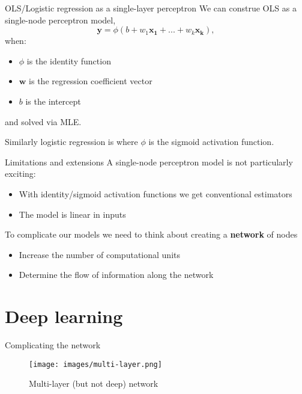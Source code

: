 \documentclass[
  ignorenonframetext,
]{beamer}
\providecommand{\tightlist}{%
  \setlength{\itemsep}{0pt}\setlength{\parskip}{0pt}}
\begin{document}
\begin{frame}{OLS/Logistic regression as a single-layer perceptron}
\protect\hypertarget{olslogistic-regression-as-a-single-layer-perceptron}{}
We can construe OLS as a single-node perceptron model, \[
\bm{y} = \phi(b + w_1\bm{x_1} + ... + w_k\bm{x_k}),
\] when:

\begin{itemize}
\tightlist
\item
  \(\phi\) is the identity function
\item
  \(\bm{w}\) is the regression coefficient vector
\item
  \(b\) is the intercept
\end{itemize}

and solved via MLE.

Similarly logistic regression is where \(\phi\) is the sigmoid
activation function.
\end{frame}

\begin{frame}{Limitations and extensions}
\protect\hypertarget{limitations-and-extensions}{}
A single-node perceptron model is not particularly exciting:

\begin{itemize}
\tightlist
\item
  With identity/sigmoid activation functions we get conventional
  estimators
\item
  The model is linear in inputs
\end{itemize}

To complicate our models we need to think about creating a
\textbf{network} of nodes

\begin{itemize}
\tightlist
\item
  Increase the number of computational units
\item
  Determine the flow of information along the network
\end{itemize}
\end{frame}

\hypertarget{deep-learning}{%
\section{Deep learning}\label{deep-learning}}

\begin{frame}{Complicating the network}
\protect\hypertarget{complicating-the-network}{}
\begin{figure}
\centering
\texttt{[image: images/multi-layer.png]}
\caption{Multi-layer (but not deep) network}
\end{figure}
\end{frame}
\end{document}
